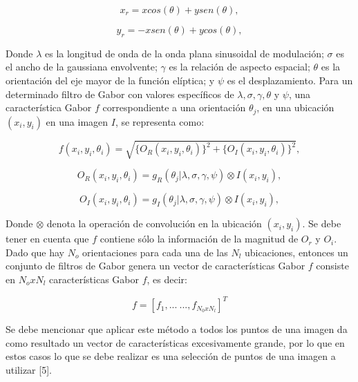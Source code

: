 \begin{enumerate}
\begin{equation}
x_{r}=xcos(\theta)+ysen(\theta),
\end{equation}

\begin{equation}
y_{r}=-xsen(\theta)+ycos(\theta),
\end{equation}

Donde $\lambda$ es la longitud de onda de la onda plana sinusoidal de modulación; $\sigma$ es el ancho de la gaussiana envolvente; $\gamma$ es la relación de aspecto espacial; $\theta$ es la orientación del eje mayor de la función elíptica; y $\psi$ es el desplazamiento. Para un determinado filtro de Gabor con valores específicos de $\lambda, \sigma, \gamma, \theta$ y $\psi$, una característica Gabor $f$ correspondiente a una orientación $\theta_{j}$, en una ubicación $(x_{i},y_{i})$ en una imagen $I$, se representa como:

\begin{equation}
f(x_{i},y_{i},\theta_{i})=\sqrt{\{O_{R}(x_{i},y_{i},\theta_{i})\}^{2}+\{O_{I}(x_{i},y_{i},\theta_{i})\}^{2}},
\end{equation}

\begin{equation}
O_{R}(x_{i},y_{i},\theta_{i})=g_{R}(\theta_{j}|\lambda,\sigma,\gamma,\psi)\otimes I(x_{i},y_{i}),
\end{equation}

\begin{equation}
O_{I}(x_{i},y_{i},\theta_{i})=g_{I}(\theta_{j}|\lambda,\sigma,\gamma,\psi)\otimes I(x_{i},y_{i}),
\end{equation}

Donde $\otimes$ denota la operación de convolución en la ubicación $(x_{i},y_{i})$. Se debe tener en cuenta que $f$ contiene sólo la información de la magnitud de $O_{r}$ y $O_{i}$. Dado que hay $N_{o}$ orientaciones para cada una de las $N_{l}$ ubicaciones, entonces un conjunto de filtros de Gabor genera un vector de características Gabor $f$ consiste en $N_{o}xN_{l}$ características Gabor $f$, es decir: 

\begin{equation}
f=[f_{1},...\ ...,f_{N_{0}xN_{l}}]^{T}
\end{equation}

Se debe mencionar que aplicar este método a todos los puntos de una imagen da como resultado un vector de características excesivamente grande, por lo que en estos casos lo que se debe realizar es una selección de puntos de una imagen a utilizar [5].


\end{enumerate}
